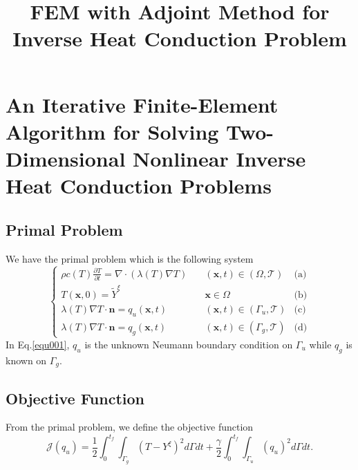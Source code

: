 \documentclass[UTF-8]{article}
\title{FEM with Adjoint Method for Inverse Heat Conduction Problem}
\author{}
\date{}
\begin{document}
\maketitle

\section{An Iterative Finite-Element Algorithm for Solving Two-Dimensional Nonlinear Inverse Heat Conduction Problems}

\subsection{Primal Problem}
We have the primal problem which is the following system
\begin{equation}\label{equ001}
	\left\{
	\begin{array}{lll}
		\rho c(T) \frac{\partial T}{\partial t} = \nabla \cdot \left( \lambda (T) \nabla T \right) \quad &(\pmb{x},t) \in (\Omega, \mathcal{T}) &\text{(a)}\\
		T(\pmb{x},0) = \tilde{Y}^\xi & \pmb{x} \in \Omega &\text{(b)}\\
		\lambda(T) \nabla T \cdot \pmb{n} = q_u(\pmb{x},t) & (\pmb{x},t) \in (\Gamma_u, \mathcal{T}) &\text{(c)}\\
		\lambda(T) \nabla T \cdot \pmb{n} = q_g(\pmb{x},t) & (\pmb{x},t) \in (\Gamma_g, \mathcal{T}) &\text{(d)}
	\end{array}
	\right.
\end{equation}
In Eq.\ref{equ001}, $q_u$ is the unknown Neumann boundary condition on $\Gamma_u$ while $q_g$ is known on $\Gamma_g$.

\subsection{Objective Function}
From the primal problem, we define the objective function
\begin{equation}
	\mathcal{J}(q_{u}) = \frac{1}{2} \int_{0}^{t_f} \int_{\Gamma_g} \left(T-Y^\xi\right)^2 d\Gamma dt + \frac{\gamma}{2} \int_{0}^{t_f}\int_{\Gamma_u} \left(q_{u}\right)^2 d\Gamma dt.
\end{equation}
\end{document}
